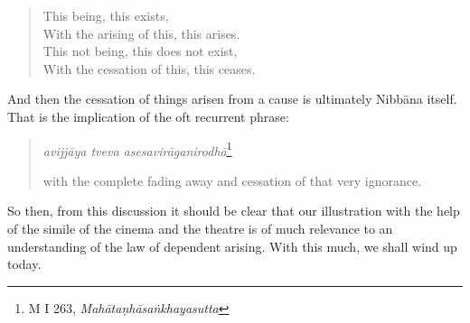 \begin{quote}
This being, this exists,\\
With the arising of this, this arises.\\
This not being, this does not exist,\\
With the cessation of this, this ceases.
\end{quote}

And then the cessation of things arisen from a cause is ultimately Nibbāna itself. That is the implication of the oft recurrent phrase:

\begin{quote}
\emph{avijjāya tveva asesavirāganirodhā}\footnote{M I 263, \emph{Mahātaṇhāsaṅkhayasutta}}

with the complete fading away and cessation of that very ignorance.
\end{quote}

So then, from this discussion it should be clear that our illustration with the help of the simile of the cinema and the theatre is of much relevance to an understanding of the law of dependent arising. With this much, we shall wind up today.
